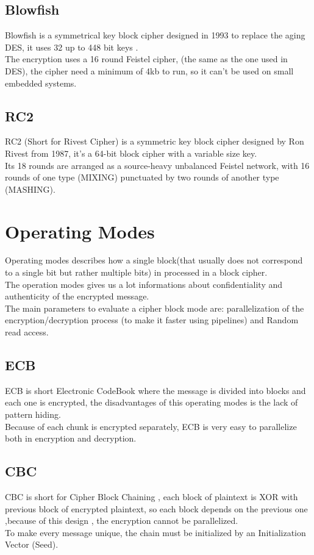 \documentclass{article}
\begin{document}
	\subsection{Blowfish}
	Blowfish is a symmetrical key block cipher designed in 1993 to replace the aging DES, it uses 32 up to 448 bit keys .\\The encryption uses a 16 round Feistel cipher, (the same as the one used in DES), the cipher need a minimum of 4kb to run, so it can't be used on small embedded systems.
	
	\subsection{RC2}
	RC2 (Short for Rivest Cipher) is a symmetric key block cipher designed by Ron Rivest from 1987, it's  a 64-bit block cipher with a variable size key. \\Its 18 rounds are arranged as a source-heavy unbalanced Feistel network, with 16 rounds of one type (MIXING) punctuated by two rounds of another type (MASHING).
	
	\section{Operating Modes}\label{sec:opMode}
	Operating modes describes how a single block(that usually does not correspond to a single bit but rather multiple bits) in processed in a block cipher.\\ The operation modes gives us a lot informations about confidentiality  and authenticity of the encrypted message.\\ The main parameters to evaluate a cipher block mode are: parallelization of the encryption/decryption process (to make it faster using pipelines) and Random read access. 
	
	\subsection{ECB}
	ECB is short Electronic CodeBook where the message is divided into blocks and each one is encrypted, the disadvantages of this operating modes is the lack of pattern hiding.\\ Because of each chunk is encrypted separately, ECB is very easy to parallelize both in encryption and decryption.
	
	\subsection{CBC}
	CBC is short for Cipher Block Chaining , each block of plaintext is XOR with previous block of encrypted plaintext, so each block depends on the previous one ,because of this design , the encryption cannot be parallelized.\\
 To make every message unique, the chain must be initialized by an Initialization Vector (Seed).  	
	
\end{document}
